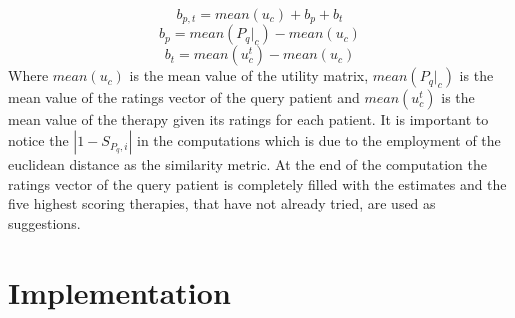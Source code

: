 \begin{equation}
		b_{p,t} = mean(u_c) + b_p + b_t
\end{equation}
\begin{equation}
		b_{p} = mean(P_{q}|_{c}) - mean(u_c)
\end{equation}
\begin{equation}
		b_{t} = mean(u_{c}^{t}) - mean(u_c)
\end{equation}
Where $mean(u_c)$ is the mean value of the utility matrix, $mean(P_{q}|_{c})$ is
the mean value of the ratings vector of the query patient and $mean(u_{c}^{t})$
is the mean value of the therapy given its ratings for each patient.
It is important to notice the $|1-S_{P_q,i}|$ in the computations which is due
to the employment of the euclidean distance as the similarity metric.
At the end of the computation the ratings vector of the query patient is
completely filled with the estimates and the five highest scoring therapies,
that have not already tried, are used as suggestions.
\section{Implementation}
